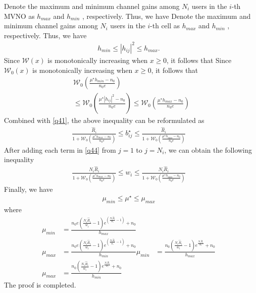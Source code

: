 \documentclass[journal]{IEEEtran}
\begin{document}
\begin{IEEEkeywords}
Denote the maximum and minimum channel gains among $N_i$ users in the $i$-th MVNO as $h_{max}$ and $h_{min}$  , respectively. Thus, we have
Denote the maximum and minimum channel gains among $N_i$ users in the $i$-th cell as $h_{max}$ and $h_{min}$  , respectively. Thus, we have
\begin{align}
h_{min} \leq \left|h_{ij}\right|^2 \leq h_{max}.
\end{align}
Since $\mathcal{W}\left(x\right)$ is monotonically increasing when $x \geq 0$, it follows that
Since $\mathcal{W}_0\left(x\right)$ is monotonically increasing when $x \geq 0$, it follows that
\begin{align}
&\mathcal{W}_0\left(\frac{\mu^\star h_{min} - n_0}{n_0e}\right) \nonumber \\ & \leq  \mathcal{W}_0 \left(\frac{\mu^\star\left|h_{ij}\right|^2 - n_0}{n_0e}\right) \leq  \mathcal{W}_0\left(\frac{\mu^\star h_{max} - n_0}{n_0e}\right)
\end{align}
Combined with \eqref{q41}, the above inequality can be reformulated as
\begin{align}
\frac{\hat{R}_i}{1 + \mathcal{W}_0\left(\frac{\mu^\star h_{max} - n_0}{n_0e}\right)} \leq b_{ij}^\star \leq \frac{\hat{R}_i}{1 + \mathcal{W}_0\left(\frac{\mu^\star h_{min} - n_0}{n_0e}\right)} \label{q44}
\end{align}
After adding each term in \eqref{q44} from $j = 1$ to $j = N_i$, we can obtain the following inequality
\begin{align}
\frac{N_i\hat{R}_i}{1 + \mathcal{W}_0\left(\frac{\mu^\star h_{max} - n_0}{n_0e}\right)} \leq w_{i} \leq \frac{N_i\hat{R}_i}{1 + \mathcal{W}_0\left(\frac{\mu^\star h_{min} - n_0}{n_0e}\right)} 
\end{align}
Finally, we have
\begin{align}
\mu_{min} \leq \mu^\star \leq \mu_{max}
\end{align}
where 
\begin{align}
\mu_{min} &= \frac{n_0e\left(\frac{N_i\hat{R}_i}{w_i} - 1\right)e^{\left(\frac{N_i\hat{R}_i}{w_i} - 1\right)} + n_0}{h_{max}}  \\
\mu_{max} & = \frac{n_0e\left(\frac{N_i\hat{R}_i}{w_i} - 1\right)e^{\left(\frac{N_i\hat{R}_i}{w_i} - 1\right)} + n_0}{h_{min}}
\mu_{min} &= \frac{n_0\left(\frac{N_i\hat{R}_i}{w_i} - 1\right)e^{\frac{N_i\hat{R}_i}{w_i}} + n_0}{h_{max}}  \\
\mu_{max} & = \frac{n_0\left(\frac{N_i\hat{R}_i}{w_i} - 1\right)e^{\frac{N_i\hat{R}_i}{w_i} } + n_0}{h_{min}}
\end{align}
The proof is completed.
 

\end{IEEEkeywords}
\end{document}
